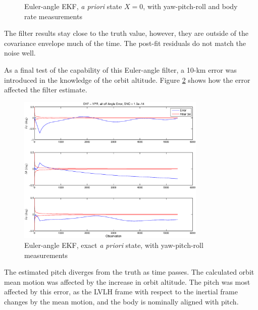 \documentclass[]{aiaa-tc}%
\begin{document}
\begin{figure}[H]
{		}
		\caption{Euler-angle EKF, \textit{a priori} state $X=0$, with yaw-pitch-roll and body rate measurements }
		\label{fig:ResultsEulerBest}
	\end{figure}	

The filter results stay close to the truth value, however, they are outside of the covariance envelope much of the time. The post-fit residuals do not match the noise well.

	\vspace{5 mm}

As a final test of the capability of this Euler-angle filter, a 10-km error was introduced in the knowledge of the orbit altitude. Figure \ref{fig:AltOff} shows how the error affected the filter estimate.
	\begin{figure}[H]
		\centering
			\includegraphics[width = 9cm]{../Figures/EKF_AltOff_AngleError.eps}

		\caption{Euler-angle EKF, exact \textit{a priori} state, with yaw-pitch-roll measurements }
		\label{fig:AltOff}
	\end{figure}	

The estimated pitch diverges from the truth as time passes. The calculated orbit mean motion was affected by the increase in orbit altitude. The pitch was most affected by this error, as the LVLH frame with respect to the inertial frame changes by the mean motion, and the body is nominally aligned with pitch.
\end{document}
